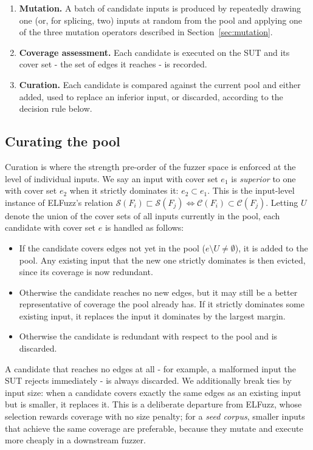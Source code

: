 \begin{enumerate}
    \item \textbf{Mutation.} A batch of candidate inputs is produced by repeatedly drawing one (or, for splicing, two) inputs at random from the pool and applying one of the three mutation operators described in Section~\ref{sec:mutation}.
    \item \textbf{Coverage assessment.} Each candidate is executed on the SUT and its cover set - the set of edges it reaches - is recorded.
    \item \textbf{Curation.} Each candidate is compared against the current pool and either added, used to replace an inferior input, or discarded, according to the decision rule below.
\end{enumerate}

\subsection{Curating the pool}
\label{sec:curation}

Curation is where the strength pre-order of the fuzzer space is enforced at the level of individual inputs. We say an input with cover set $e_1$ is \textit{superior} to one with cover set $e_2$ when it strictly dominates it: $e_2 \subset e_1$. This is the input-level instance of ELFuzz's relation $\mathcal{S}(F_i) \sqsubset \mathcal{S}(F_j) \iff \mathcal{C}(F_i) \subset \mathcal{C}(F_j)$. Letting $U$ denote the union of the cover sets of all inputs currently in the pool, each candidate with cover set $e$ is handled as follows:

\begin{itemize}
    \item If the candidate covers edges not yet in the pool ($e \setminus U \neq \emptyset$), it is added to the pool. Any existing input that the new one strictly dominates is then evicted, since its coverage is now redundant.
    \item Otherwise the candidate reaches no new edges, but it may still be a better representative of coverage the pool already has. If it strictly dominates some existing input, it replaces the input it dominates by the largest margin.
    \item Otherwise the candidate is redundant with respect to the pool and is discarded.
\end{itemize}

A candidate that reaches no edges at all - for example, a malformed input the SUT rejects immediately - is always discarded. We additionally break ties by input size: when a candidate covers exactly the same edges as an existing input but is smaller, it replaces it. This is a deliberate departure from ELFuzz, whose selection rewards coverage with no size penalty; for a \textit{seed corpus}, smaller inputs that achieve the same coverage are preferable, because they mutate and execute more cheaply in a downstream fuzzer.


